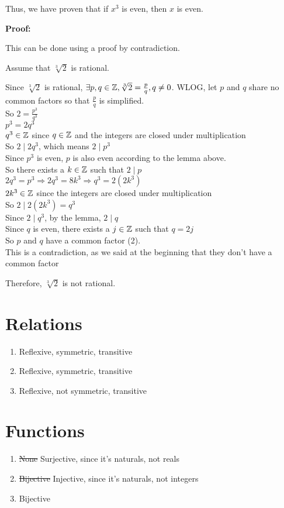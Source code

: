 \documentclass[12pt, leqno]{article}
\begin{document}
\begin{enumerate}
    Thus, we have proven that if $x^3$ is even, then $x$ is even.

    \textbf{Proof:}

    This can be done using a proof by contradiction.

    Assume that $\sqrt[3]{2}$ is rational.

    Since $\sqrt[3]{2}$ is rational, $\exists p, q \in \mathbb Z, \sqrt[3]{2} = \frac p q, q \neq 0$. WLOG, let $p$ and $q$ share no common factors so that $\frac p q$ is simplified.\\
    So $2 = \frac{p^3}{q^3}$\\
    $p^3 = 2q^3$\\
    $q^3 \in \mathbb Z$ since $q \in \mathbb Z$ and the integers are closed under multiplication\\
    So $2 \mid 2q^3$, which means $2 \mid p^3$\\
    Since $p^3$ is even, $p$ is also even according to the lemma above.\\
    So there exists a $k \in \mathbb Z$ such that $2 \mid p$\\
    $2q^3 = p^3 \Rightarrow 2q^3 = 8k^3 \Rightarrow q^3 = 2(2k^3)$\\
    $2k^3 \in \mathbb Z$ since the integers are closed under multiplication\\
    So $2 \mid 2(2k^3) = q^3$\\
    Since $2 \mid q^3$, by the lemma, $2 \mid q$\\
    Since $q$ is even, there exists a $j \in \mathbb Z$ such that $q = 2j$\\
    So $p$ and $q$ have a common factor (2).\\
    This is a contradiction, as we said at the beginning that they don't have a common factor

    Therefore, $\sqrt[3]{2}$ is not rational.
\end{enumerate}

\section{Relations}

\begin{enumerate}
    \item Reflexive, symmetric, transitive
    \item Reflexive, symmetric, transitive
    \item Reflexive, not symmetric, transitive
\end{enumerate}

\section{Functions}

\begin{enumerate}
    \item \sout{None} Surjective, since it's naturals, not reals
    \item \sout{Bijective} Injective, since it's naturals, not integers
    \item Bijective
\end{enumerate}
\end{document}
